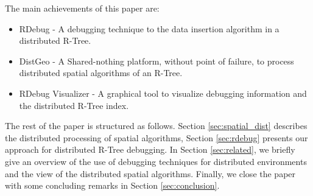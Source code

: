 The main achievements of this paper are:

\begin{itemize}
  \item RDebug - A debugging technique to the data insertion algorithm in a distributed R-Tree.
  \item DistGeo - A Shared-nothing platform, without point of failure, to process distributed spatial algorithms of an R-Tree.
  \item RDebug Visualizer - A graphical tool to visualize debugging information and the distributed R-Tree index.
\end{itemize}

The rest of the paper is structured as follows. Section \ref{sec:spatial_dist} describes the distributed processing of spatial algorithms, Section \ref{sec:rdebug} presents our approach for distributed R-Tree debugging. In Section \ref{sec:related}, we briefly give an overview of the use of debugging techniques for distributed environments and the view of the distributed spatial algorithms. Finally, we close the paper with some concluding remarks in Section \ref{sec:conclusion}.